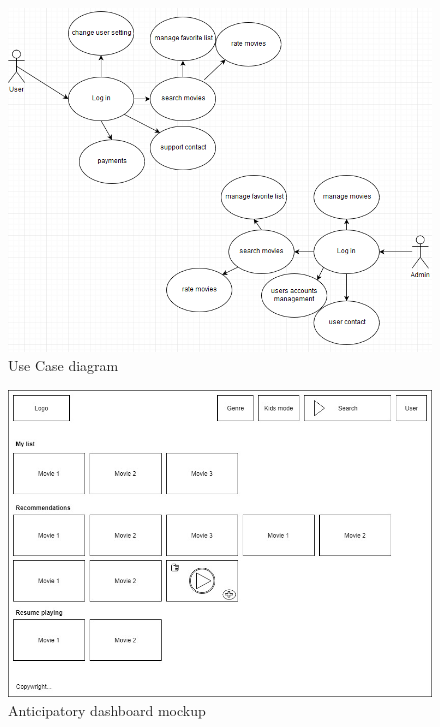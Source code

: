 \documentclass{scrreprt}
\begin{document}
\begin{figure}[h]
  \centering
  \includegraphics[width=1\textwidth]{img/usecase.PNG}
  \caption{Use Case diagram}
  \label{fig:Use case}
\end{figure}

\begin{figure}[h]
  \centering
  \includegraphics[width=1\textwidth]{img/UI.jpg}
  \caption{Anticipatory dashboard mockup}
  \label{fig:UI}
\end{figure}
\end{document}
